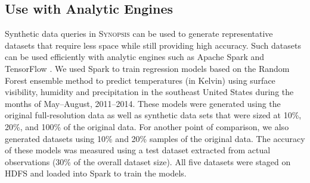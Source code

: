 \subsection{Use with Analytic Engines}
Synthetic data queries in \textsc{Synopsis} can be used to generate representative datasets that require less space while still providing high accuracy.  
Such datasets can be used efficiently with analytic engines such as Apache Spark \cite{zaharia2010spark} and TensorFlow \cite{tensorflow}.  
We used Spark to train regression models based on the Random Forest ensemble method to predict temperatures (in Kelvin) using surface visibility, humidity and precipitation in the southeast United States during the months of May--August, 2011--2014.
These models were generated using the original full-resolution data as well as synthetic data sets that were sized at 10\%, 20\%, and 100\% of the original data.
For another point of comparison, we also generated datasets using 10\% and 20\% samples of the original data.
The accuracy of these models was measured using a test dataset extracted from actual observations (30\% of the overall dataset size).
All five datasets were staged on HDFS and loaded into Spark to train the models.

